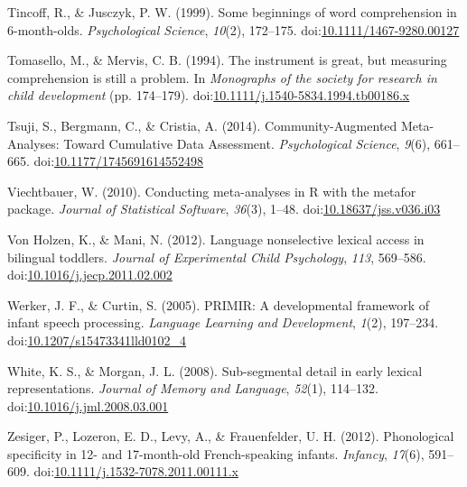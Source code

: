 \documentclass[man]{apa6}
\theoremstyle{definition}
\theoremstyle{definition}
\theoremstyle{definition}
\theoremstyle{remark}
\begin{document}
\hypertarget{ref-Tincoff1999}{}
Tincoff, R., \& Jusczyk, P. W. (1999). Some beginnings of word
comprehension in 6-month-olds. \emph{Psychological Science},
\emph{10}(2), 172--175.
doi:\href{https://doi.org/10.1111/1467-9280.00127}{10.1111/1467-9280.00127}

\hypertarget{ref-Tomasello1994}{}
Tomasello, M., \& Mervis, C. B. (1994). The instrument is great, but
measuring comprehension is still a problem. In \emph{Monographs of the
society for research in child development} (pp. 174--179).
doi:\href{https://doi.org/10.1111/j.1540-5834.1994.tb00186.x}{10.1111/j.1540-5834.1994.tb00186.x}

\hypertarget{ref-Tsuji2014}{}
Tsuji, S., Bergmann, C., \& Cristia, A. (2014). Community-Augmented
Meta-Analyses: Toward Cumulative Data Assessment. \emph{Psychological
Science}, \emph{9}(6), 661--665.
doi:\href{https://doi.org/10.1177/1745691614552498}{10.1177/1745691614552498}

\hypertarget{ref-metafor}{}
Viechtbauer, W. (2010). Conducting meta-analyses in R with the metafor
package. \emph{Journal of Statistical Software}, \emph{36}(3), 1--48.
doi:\href{https://doi.org/10.18637/jss.v036.i03}{10.18637/jss.v036.i03}

\hypertarget{ref-VonHolzen2012}{}
Von Holzen, K., \& Mani, N. (2012). Language nonselective lexical access
in bilingual toddlers. \emph{Journal of Experimental Child Psychology},
\emph{113}, 569--586.
doi:\href{https://doi.org/10.1016/j.jecp.2011.02.002}{10.1016/j.jecp.2011.02.002}

\hypertarget{ref-Werker2005}{}
Werker, J. F., \& Curtin, S. (2005). PRIMIR: A developmental framework
of infant speech processing. \emph{Language Learning and Development},
\emph{1}(2), 197--234.
doi:\href{https://doi.org/10.1207/s15473341lld0102_4}{10.1207/s15473341lld0102\_4}

\hypertarget{ref-White2008}{}
White, K. S., \& Morgan, J. L. (2008). Sub-segmental detail in early
lexical representations. \emph{Journal of Memory and Language},
\emph{52}(1), 114--132.
doi:\href{https://doi.org/10.1016/j.jml.2008.03.001}{10.1016/j.jml.2008.03.001}

\hypertarget{ref-Zesiger2012}{}
Zesiger, P., Lozeron, E. D., Levy, A., \& Frauenfelder, U. H. (2012).
Phonological specificity in 12- and 17-month-old French-speaking
infants. \emph{Infancy}, \emph{17}(6), 591--609.
doi:\href{https://doi.org/10.1111/j.1532-7078.2011.00111.x}{10.1111/j.1532-7078.2011.00111.x}

\endgroup
\end{document}
